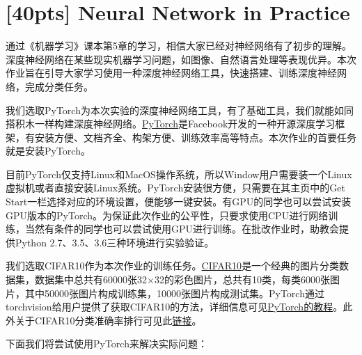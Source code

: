 \documentclass[a4paper,UTF8]{article}
\numberwithin{equation}{section}
\begin{document}
\section{[40pts] Neural Network in Practice}
通过《机器学习》课本第5章的学习，相信大家已经对神经网络有了初步的理解。深度神经网络在某些现实机器学习问题，如图像、自然语言处理等表现优异。本次作业旨在引导大家学习使用一种深度神经网络工具，快速搭建、训练深度神经网络，完成分类任务。

我们选取PyTorch为本次实验的深度神经网络工具，有了基础工具，我们就能如同搭积木一样构建深度神经网络。\href{http://pytorch.org/}{PyTorch}是Facebook开发的一种开源深度学习框架，有安装方便、文档齐全、构架方便、训练效率高等特点。本次作业的首要任务就是安装PyTorch。

目前PyTorch仅支持Linux和MacOS操作系统，所以Window用户需要装一个Linux虚拟机或者直接安装Linux系统。PyTorch安装很方便，只需要在其主页中的Get Start一栏选择对应的环境设置，便能够一键安装。有GPU的同学也可以尝试安装GPU版本的PyTorch。为保证此次作业的公平性，只要求使用CPU进行网络训练，当然有条件的同学也可以尝试使用GPU进行训练。在批改作业时，助教会提供Python 2.7、3.5、3.6三种环境进行实验验证。

我们选取CIFAR10作为本次作业的训练任务。\href{https://en.wikipedia.org/wiki/CIFAR-10}{CIFAR10}是一个经典的图片分类数据集，数据集中总共有60000张32$\times$32的彩色图片，总共有10类，每类6000张图片，其中50000张图片构成训练集，10000张图片构成测试集。PyTorch通过torchvision给用户提供了获取CIFAR10的方法，详细信息可见\href{http://pytorch.org/tutorials/beginner/blitz/cifar10_tutorial.html}{PyTorch的教程}。此外关于CIFAR10分类准确率排行可见此\href{http://rodrigob.github.io/are_we_there_yet/build/classification_datasets_results.html}{链接}。

下面我们将尝试使用PyTorch来解决实际问题：
\end{document}
